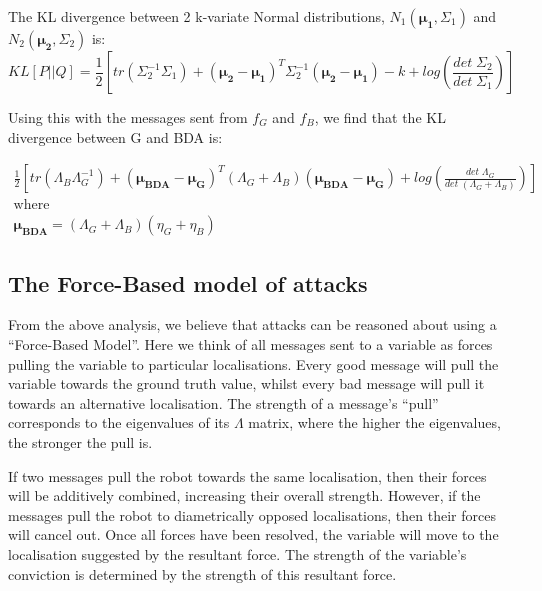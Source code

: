 The KL divergence between 2 k-variate Normal distributions, $N_1(\boldsymbol{\mu_1}, \Sigma_1)$ and $N_2(\boldsymbol{\mu_2}, \Sigma_2)$ is:
\begin{equation}
	KL\left[P || Q \right] = \frac{1}{2}\left[
		tr(\Sigma_2^{-1}\Sigma_1) + \left(\boldsymbol{\mu_2} - \boldsymbol{\mu_1}\right)^T \Sigma_2^{-1} \left(\boldsymbol{\mu_2} - \boldsymbol{\mu_1}\right) - k + log\left(\frac{det \; \Sigma_2}{det \; \Sigma_1}\right)
	\right]
\end{equation}

Using this with the messages sent from $f_G$ and $f_B$, we find that the KL divergence between G and BDA is:

\begin{gather}
	\frac{1}{2} \left[
		tr\left(\Lambda_B\Lambda_G^{-1}\right) +
		\left(\boldsymbol{\mu_{BDA}} - \boldsymbol{\mu_G}\right)^T \left(\Lambda_G + \Lambda_B\right) \left(\boldsymbol{\mu_{BDA}} - \boldsymbol{\mu_G}\right) + log\left(\frac{det \; \Lambda_G}{det \; \left(\Lambda_G + \Lambda_B\right)}\right)
	\right]\\
	\text{where}\nonumber\\
	\boldsymbol{\mu_{BDA}} = \left(\Lambda_G + \Lambda_B\right) \left(\eta_G + \eta_B\right)\nonumber
\end{gather}

\subsection{The Force-Based model of attacks}
From the above analysis, we believe that attacks can be reasoned about using a ``Force-Based Model''. Here we think of all messages sent to a variable as forces pulling the variable to particular localisations. Every good message will pull the variable towards the ground truth value, whilst every bad message will pull it towards an alternative localisation. The strength of a message's ``pull'' corresponds to the eigenvalues of its $\Lambda$ matrix, where the higher the eigenvalues, the stronger the pull is.

If two messages pull the robot towards the same localisation, then their forces will be additively combined, increasing their overall strength. However, if the messages pull the robot to diametrically opposed localisations, then their forces will cancel out. Once all forces have been resolved, the variable will move to the localisation suggested by the resultant force. The strength of the variable's conviction is determined by the strength of this resultant force.

